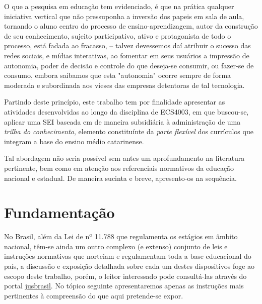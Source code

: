O que a pesquisa em educação tem evidenciado, é que na prática qualquer iniciativa vertical que não pressuponha a inversão dos papeis em sala de aula, tornando o aluno centro do processo de ensino-aprendizagem, autor da construção de seu conhecimento, sujeito participativo, ativo e protagonista de todo o processo, está fadada ao fracasso, -- talvez devessemos daí atribuir o sucesso das redes sociais, e mídias interativas, ao fomentar em seus usuários a impressão de autonomia, poder de decisão e controle do que deseja-se consumir, ou fazer-se de consumo, embora saibamos que esta "autonomia" ocorre sempre de forma moderada e subordinada aos vieses das empresas detentoras de tal tecnologia.


%
%


Partindo deste princípio, este trabalho tem por finalidade apresentar as atividades desenvolvidas ao longo da disciplina de \ac{ECS4003}, em que buscou-se, aplicar uma \ac{SEI} baseada em \cite{MARIO:2017} de maneira subsidiária à administração de uma \textit{trilha do conhecimento}, elemento constituínte da \textit{parte flexível} dos currículos que integram a base do ensino médio catarinense.

Tal abordagem não seria possível sem  antes um aprofundamento na literatura pertinente, bem como em atenção aos referenciais normativos da educação nacional e estadual. De maneira sucinta e breve, apresento-os na sequência.

\section{Fundamentação} %
\label{sec:Referenciais}
No Brasil, além da Lei de nº 11.788 que regulamenta os estágios em âmbito nacional, têm-se ainda um outro complexo (e extenso) conjunto de leis e instruções normativas que norteiam e regulamentam toda a base educacional do país, a discussão e exposição detalhada sobre cada um destes dispositivos foge ao escopo deste trabalho, porém, o leitor interessado pode consultá-las através do portal \href{https://www.jusbrasil.com.br/}{jusbrasil}. No tópico seguinte apresentaremos apenas as instruções mais pertinentes à compreensão do que aqui pretende-se expor.

